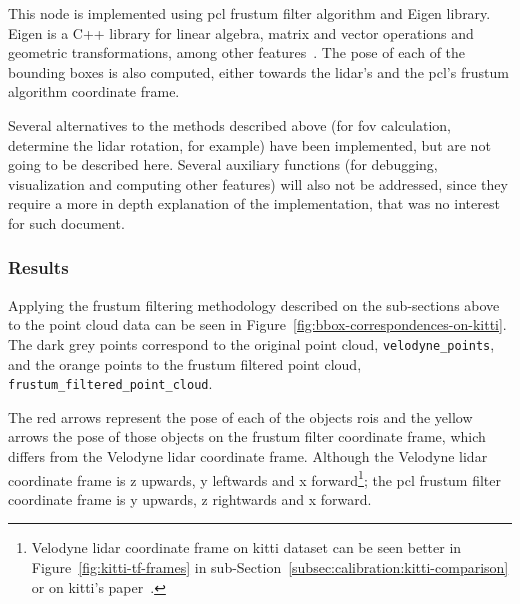 %	


This node is implemented using \ac{pcl} frustum filter algorithm and Eigen library. Eigen is a C++ library for linear algebra, matrix and vector operations and geometric transformations, among other features~\cite{Eigenv3}. The pose of each of the bounding boxes is also computed, either towards the \ac{lidar}'s and the \ac{pcl}'s frustum algorithm coordinate frame. 

Several alternatives to the methods described above (for \ac{fov} calculation, determine the \ac{lidar} rotation, for example) have been implemented, but are not going to be described here. Several auxiliary functions (for debugging, visualization and computing other features) will also not be addressed, since they require a more in depth explanation of the implementation, that was no interest for such document. 


\subsubsection{Results}
Applying the frustum filtering methodology described on the sub-sections above to the point cloud data can be seen in Figure~\ref{fig:bbox-correspondences-on-kitti}. The dark grey points correspond to the original point cloud, \texttt{velodyne\_points}, and the orange points to the frustum filtered point cloud, \texttt{frustum\_filtered\_point\_cloud}.

The red arrows represent the pose of each of the objects \acp{roi} and the yellow arrows the pose of those objects on the frustum filter coordinate frame, which differs from the Velodyne \ac{lidar} coordinate frame. Although the Velodyne \ac{lidar} coordinate frame is z upwards, y leftwards and x forward\footnote{Velodyne \ac{lidar} coordinate frame on \ac{kitti} dataset can be seen better in Figure~\ref{fig:kitti-tf-frames} in sub-Section~\ref{subsec:calibration:kitti-comparison} or on \ac{kitti}'s paper~\cite{Geiger2013a}.}; the \ac{pcl} frustum filter coordinate frame is y upwards, z rightwards and x forward.


